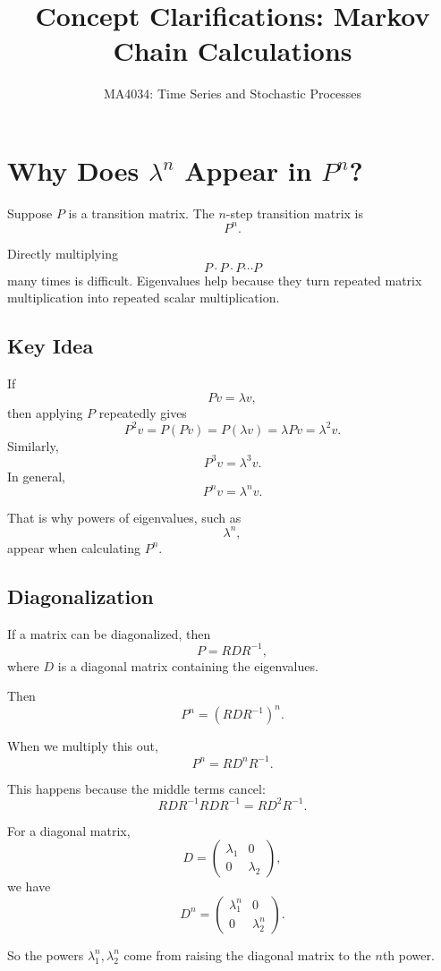 \documentclass[12pt,a4paper]{article}
\title{\textbf{Concept Clarifications: Markov Chain Calculations}}
\author{MA4034: Time Series and Stochastic Processes}
\date{}
\theoremstyle{notestyle}
\begin{document}
\maketitle

\section{Why Does $\lambda^n$ Appear in $P^n$?}

Suppose $P$ is a transition matrix. The $n$-step transition matrix is
\[
P^n.
\]

Directly multiplying
\[
P\cdot P\cdot P\cdots P
\]
many times is difficult. Eigenvalues help because they turn repeated matrix multiplication into repeated scalar multiplication.

\subsection*{Key Idea}

If
\[
Pv=\lambda v,
\]
then applying $P$ repeatedly gives
\[
P^2v=P(Pv)=P(\lambda v)=\lambda Pv=\lambda^2v.
\]
Similarly,
\[
P^3v=\lambda^3v.
\]
In general,
\[
P^nv=\lambda^nv.
\]

That is why powers of eigenvalues, such as
\[
\lambda^n,
\]
appear when calculating $P^n$.

\subsection*{Diagonalization}

If a matrix can be diagonalized, then
\[
P=RDR^{-1},
\]
where $D$ is a diagonal matrix containing the eigenvalues.

Then
\[
P^n=(RDR^{-1})^n.
\]

When we multiply this out,
\[
P^n=RD^nR^{-1}.
\]

This happens because the middle terms cancel:
\[
RDR^{-1}RDR^{-1}=RD^2R^{-1}.
\]

For a diagonal matrix,
\[
D=
\begin{pmatrix}
\lambda_1 & 0\\
0 & \lambda_2
\end{pmatrix},
\]
we have
\[
D^n=
\begin{pmatrix}
\lambda_1^n & 0\\
0 & \lambda_2^n
\end{pmatrix}.
\]

So the powers $\lambda_1^n,\lambda_2^n$ come from raising the diagonal matrix to the $n$th power.
\end{document}
